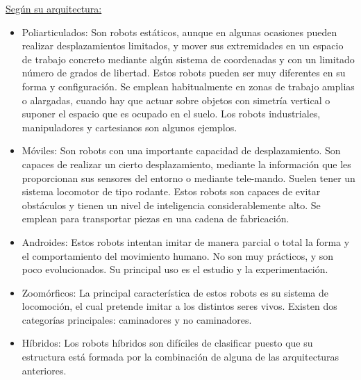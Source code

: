 \underline{Según su arquitectura:} 
\begin{itemize}
\item Poliarticulados: Son robots estáticos, aunque en algunas ocasiones pueden realizar desplazamientos limitados, y mover sus extremidades en un espacio de trabajo concreto mediante algún sistema de coordenadas y con un limitado número de grados de libertad. Estos robots pueden ser muy diferentes en su forma y configuración. Se emplean habitualmente en zonas de trabajo amplias o alargadas, cuando hay que actuar sobre objetos con simetría vertical o suponer el espacio que es ocupado en el suelo. Los robots industriales, manipuladores y cartesianos son algunos ejemplos.
\item Móviles: Son robots con una importante capacidad de desplazamiento. Son capaces de realizar un cierto desplazamiento, mediante la información que les proporcionan sus sensores del entorno o mediante tele-mando. Suelen tener un sistema locomotor de tipo rodante. Estos robots son capaces de evitar obstáculos y tienen un nivel de inteligencia considerablemente alto. Se emplean para transportar piezas en una cadena de fabricación.
\item Androides: Estos robots intentan imitar de manera parcial o total la forma y el comportamiento del movimiento humano. No son muy prácticos, y son poco evolucionados. Su principal uso es el estudio y la experimentación.
\item	Zoomórficos: La principal característica de estos robots es su sistema de locomoción, el cual pretende imitar a los distintos seres vivos. Existen dos categorías principales: caminadores y no caminadores.
\item Híbridos: Los robots híbridos son difíciles de clasificar puesto que su estructura está formada por la combinación de alguna de las arquitecturas anteriores.\\
\end{itemize}

